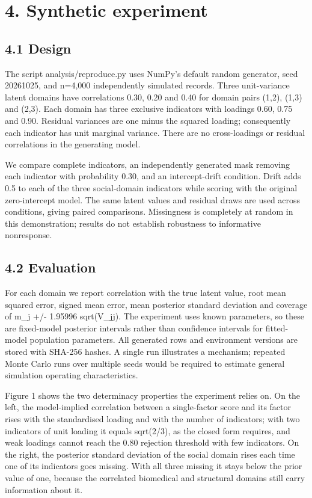 \documentclass[11pt,a4paper]{article}
\begin{document}
\section*{4. Synthetic experiment}
\subsection*{4.1 Design}
The script analysis/reproduce.py uses NumPy's default random generator, seed 20261025, and n=4,000 independently simulated records. Three unit-variance latent domains have correlations 0.30, 0.20 and 0.40 for domain pairs (1,2), (1,3) and (2,3). Each domain has three exclusive indicators with loadings 0.60, 0.75 and 0.90. Residual variances are one minus the squared loading; consequently each indicator has unit marginal variance. There are no cross-loadings or residual correlations in the generating model.

We compare complete indicators, an independently generated mask removing each indicator with probability 0.30, and an intercept-drift condition. Drift adds 0.5 to each of the three social-domain indicators while scoring with the original zero-intercept model. The same latent values and residual draws are used across conditions, giving paired comparisons. Missingness is completely at random in this demonstration; results do not establish robustness to informative nonresponse.

\subsection*{4.2 Evaluation}
For each domain we report correlation with the true latent value, root mean squared error, signed mean error, mean posterior standard deviation and coverage of m\_j +/- 1.95996 sqrt(V\_jj). The experiment uses known parameters, so these are fixed-model posterior intervals rather than confidence intervals for fitted-model population parameters. All generated rows and environment versions are stored with SHA-256 hashes. A single run illustrates a mechanism; repeated Monte Carlo runs over multiple seeds would be required to estimate general simulation operating characteristics.

Figure 1 shows the two determinacy properties the experiment relies on. On the left, the model-implied correlation between a single-factor score and its factor rises with the standardised loading and with the number of indicators; with two indicators of unit loading it equals sqrt(2/3), as the closed form requires, and weak loadings cannot reach the 0.80 rejection threshold with few indicators. On the right, the posterior standard deviation of the social domain rises each time one of its indicators goes missing. With all three missing it stays below the prior value of one, because the correlated biomedical and structural domains still carry information about it.
\end{document}
